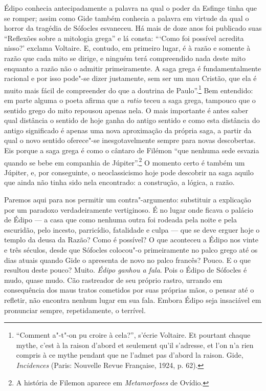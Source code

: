 Édipo conhecia antecipadamente a palavra na qual o poder da Esfinge
tinha que se romper; assim como Gide também conhecia a palavra em
virtude da qual o horror da tragédia de Sófocles esvaneceu. Há mais de
doze anos foi publicado suas ``Reflexões sobre a mitologia grega'' e lá
consta: ```Como foi possível acredita nisso?' exclama Voltaire. E,
contudo, em primeiro lugar, é à razão e somente à razão que cada mito se
dirige, e ninguém terá compreendido nada deste mito enquanto a razão não
o admitir primeiramente. A saga grega é fundamentalmente racional e por
isso pode"-se dizer justamente, sem ser um mau Cristão, que ela é muito
mais fácil de compreender do que a doutrina de Paulo''.\footnote{``Comment
  a"-t"-on pu croire à cela?'', s'écrie Voltaire. Et pourtant chaque
  mythe, c'est à la raison d'abord et seulement qu'il s'adresse, et l'on
  n'a rien compris à ce mythe pendant que ne l'admet pas d'abord la
  raison. Gide, \emph{Incidences} (Paris: Nouvelle Revue Française,
  1924, p. 62). \versal{[N. T.]}} Bem entendido: em parte alguma o poeta afirma que a
\emph{ratio} teceu a saga grega, tampouco que o sentido grego do mito
repousou apenas nela. O mais importante é antes saber qual distância o
sentido de hoje ganha do antigo sentido e como esta distância do antigo
significado é apenas uma nova aproximação da própria saga, a partir da
qual o novo sentido oferece"-se inesgotavelmente sempre para novas
descobertas. Eis porque a saga grega é como o cântaro de Filémon ``que
nenhuma sede esvazia quando se bebe em companhia de Júpiter''.\footnote{A história de Filemon aparece em \emph{Metamorfoses} de Ovídio. \versal{[N. E.]}} O
momento certo é também um Júpiter, e, por conseguinte, o neoclassicismo
hoje pode descobrir na saga aquilo que ainda não tinha sido nela
encontrado: a construção, a lógica, a razão.

Paremos aqui para nos permitir um contra"-argumento: substituir a
explicação por um paradoxo verdadeiramente vertiginoso. É no lugar onde
ficava o palácio de Édipo --- a casa que como nenhuma outra foi rodeada
pela noite e pela escuridão, pelo incesto, parricídio, fatalidade e
culpa --- que se deve erguer hoje o templo da deusa da Razão? Como é
possível? O que aconteceu a Édipo nos vinte e três séculos, desde que
Sófocles colocou"-o primeiramente no palco grego até os dias atuais
quando Gide o apresenta de novo no palco francês? Pouco. E o que
resultou deste pouco? Muito. \emph{Édipo ganhou a fala}. Pois o Édipo de
Sófocles é mudo, quase mudo. Cão rastreador de seu próprio rastro,
urrando em consequência dos maus tratos cometidos por suas próprias
mãos, o pensar até o refletir, não encontra nenhum lugar em sua fala.
Embora Édipo seja insaciável em pronunciar sempre, repetidamente, o
terrível.

